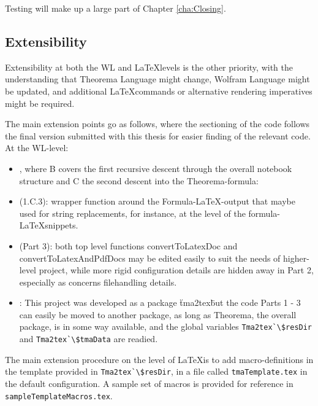 Testing will make up a large part of Chapter \ref{cha:Closing}.

\subsection{Extensibility}

Extensibility at both the WL and \LaTeX levels is the other priority, with the understanding that Theorema Language might change, Wolfram Language might be updated, and additional \LaTeX commands or alternative rendering imperatives might be required.

The main extension points go as follows, where the sectioning of the code follows the final version submitted with this thesis for easier finding of the relevant code. At the WL-level:

\begin{itemize}
    \item {}, where B covers the first recursive descent through the overall notebook structure and C the second descent into the Theorema-formula:
    
    \item {} (1.C.3): wrapper function around the Formula-\LaTeX-output that maybe used for string replacements, for instance, at the level of the formula-\LaTeX snippets.
    \item {} (Part 3): both top level functions convertToLatexDoc and convertToLatexAndPdfDocs may be edited easily to suit the needs of higher-level project, while more rigid configuration details are hidden away in Part 2, especially as concerns filehandling details.
    \item {}: This project was developed as a package \"tma2tex\" but the code Parts 1 - 3 can easily be moved to another package, as long as Theorema, the overall package, is in some way available, and the global variables \lstinline+Tma2tex`\$resDir+ and \lstinline+Tma2tex`\$tmaData+ are readied.
\end{itemize}

The main extension procedure on the level of \LaTeX is to add macro-definitions in the template provided in \lstinline+Tma2tex`\$resDir+, in a file called \lstinline+tmaTemplate.tex+ in the default configuration. A sample set of macros is provided for reference in \lstinline+sampleTemplateMacros.tex+.


